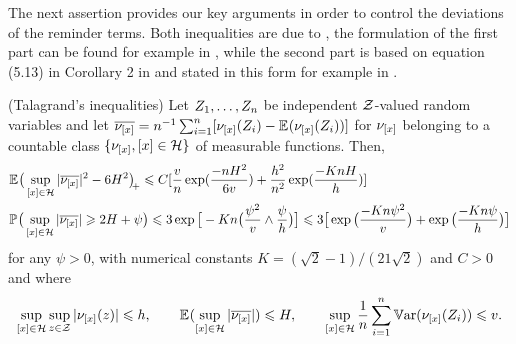 \begin{te}
 The next assertion
provides our key arguments in order to control the deviations of the
reminder terms.  Both inequalities are due to
, the formulation of the first part  can be found for
example in , while the second part is  based on
equation (5.13) in Corollary 2 in  and stated
in this form for example in  .
\end{te}
\begin{lm}(Talagrand's inequalities)\label{re:tal}\label{LM_TALAGRAND} Let
  $Z_1,\dotsc,Z_n$ be independent ${\mathcal Z}$-valued random variables and let $\overline{\nu_{[x]}}=n^{-1}\sum_{i=1}^n[\nu_{[x]}(Z_i)-{\mathbb E}_{}(\nu_{[x]}(Z_i)) ]$ for $\nu_{[x]}$ belonging to a countable class $\{\nu_{[x]},[x]\in{\mathcal H}\}$ of measurable functions. Then,
\begin{align}
	 &{\mathbb E}_{}{\big( \sup_{[x]\in{\mathcal H}}|\overline{\nu_{[x]}}|^2-6H^2\big)_{\hspace*{-.5ex}+}}\leqslant C [\frac{v}{n}\exp(\frac{-nH^2}{6v})+\frac{h^2}{n^2}\exp(\frac{-K n H}{h}) ]\label{re:tal:e1} \\
	&{\mathbb P}_{}\big(\sup_{[x]\in{\mathcal H}}|\overline{\nu_{[x]}}|\geqslant2H+\psi\big)\leqslant3\exp\big[-Kn\big(\frac{\psi^2}{v}\wedge\frac{\psi}{h}\big)\big]\leqslant 3\big[\exp\big(\frac{-Kn\psi^2}{v}\big)+\exp\big(\frac{-Kn\psi}{h}\big)\big]\label{re:tal:e2}
\end{align}
for any $\psi>0$, with numerical constants $K=({\sqrt{2}-1})/({21\sqrt{2}})$ and $C>0$ and where
\begin{equation*}
	\sup_{[x]\in{\mathcal H}}\sup_{z\in{\mathcal Z}}|\nu_{[x]}(z)|\leqslant h,\qquad {\mathbb E}_{}(\sup_{[x]\in{\mathcal H}}|\overline{\nu_{[x]}}|)\leqslant H,\qquad \sup_{[x]\in{\mathcal H}}\frac{1}{n}\sum_{i=1}^n \mathop{\mathrm{\mathbb{V}ar}}\nolimits(\nu_{[x]}(Z_i))\leqslant v.
\end{equation*}
\reEnd
\end{lm}

